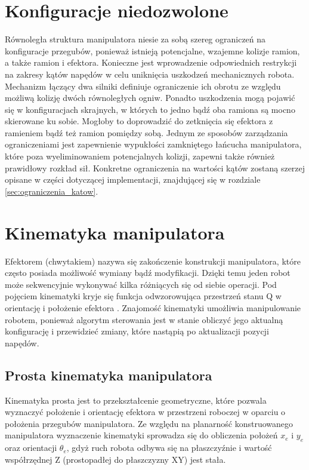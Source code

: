 \documentclass[printmode]{mgr}
\begin{document}
\section{Konfiguracje niedozwolone}\label{sec:konfiguracje_niedozwolone}
Równoległa struktura manipulatora niesie za sobą szereg ograniczeń na konfiguracje przegubów, ponieważ
istnieją potencjalne, wzajemne kolizje ramion, a także ramion i efektora. Konieczne jest wprowadzenie odpowiednich restrykcji
na zakresy kątów napędów w celu uniknięcia uszkodzeń mechanicznych robota. Mechanizm
łączący dwa silniki definiuje ograniczenie ich obrotu ze względu możliwą kolizję dwóch równoległych ogniw. 
Ponadto uszkodzenia mogą pojawić się w konfiguracjach skrajnych, w których to jedno bądź oba ramiona są mocno
skierowane ku sobie. Mogłoby to doprowadzić do zetknięcia się efektora z ramieniem bądź też ramion pomiędzy sobą.
Jednym ze sposobów zarządzania ograniczeniami jest zapewnienie wypukłości zamkniętego łańcucha manipulatora, 
które poza wyeliminowaniem potencjalnych kolizji, zapewni także również prawidłowy rozkład sił.
Konkretne ograniczenia na wartości kątów zostaną szerzej opisane w części dotyczącej implementacji, 
znajdującej się w rozdziale \ref{sec:ograniczenia_katow}.


\section{Kinematyka manipulatora}
Efektorem (chwytakiem) nazywa się zakończenie konstrukcji manipulatora, które często posiada możliwość wymiany bądź modyfikacji. 
Dzięki temu jeden robot może sekwencyjnie wykonywać kilka różniących się od siebie operacji. Pod pojęciem kinematyki kryje się
funkcja odwzorowująca przestrzeń stanu Q w orientację i położenie efektora \cite{podstawy_robotyki}.
Znajomość kinematyki umożliwia manipulowanie robotem, ponieważ algorytm sterowania
jest w stanie obliczyć jego aktualną konfigurację i przewidzieć zmiany, które nastąpią po aktualizacji pozycji napędów.

\subsection{Prosta kinematyka manipulatora}\label{sec:prosta_kinematyka}
Kinematyka prosta jest to przekształcenie geometryczne,
które pozwala wyznaczyć położenie i orientację efektora w przestrzeni roboczej w oparciu o położenia przegubów manipulatora.
Ze względu na planarność konstruowanego manipulatora wyznaczenie kinematyki sprowadza się do obliczenia położeń $x_e$ i $y_e$ oraz
orientacji $\theta_e$, gdyż
ruch robota odbywa się na płaszczyźnie i wartość współrzędnej Z (prostopadłej do płaszczyzny XY) jest stała.
\end{document}
